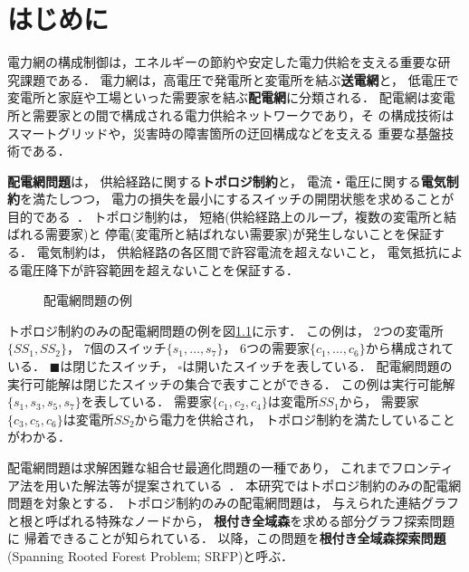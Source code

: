 \chapter{はじめに} \label{chap:intro}

電力網の構成制御は，エネルギーの節約や安定した電力供給を支える重要な研
究課題である\cite{25627,103687}．
電力網は，高電圧で発電所と変電所を結ぶ\textbf{送電網}と，
低電圧で変電所と家庭や工場といった需要家を結ぶ\textbf{配電網}に分類される．
配電網は変電所と需要家との間で構成される電力供給ネットワークであり，そ
の構成技術はスマートグリッドや，災害時の障害箇所の迂回構成などを支える
重要な基盤技術である．

\textbf{配電網問題}は，
供給経路に関する\textbf{トポロジ制約}と，
電流・電圧に関する\textbf{電気制約}を満たしつつ，
電力の損失を最小にするスイッチの開閉状態を求めることが目的である~\cite{Hayashi:dnet:model}．
トポロジ制約は，
短絡(供給経路上のループ，複数の変電所と結ばれる需要家)と
停電(変電所と結ばれない需要家)が発生しないことを保証する．
電気制約は，
供給経路の各区間で許容電流を超えないこと，
電気抵抗による電圧降下が許容範囲を超えないことを保証する．

\begin{figure}[tbp]
 \centering
 
 \caption{配電網問題の例}
 \label{fig:dnet}
\end{figure}

トポロジ制約のみの配電網問題の例を図\ref{fig:dnet}に示す．
この例は，
2つの変電所$\{SS_{1}, SS_{2}\}$，
7個のスイッチ$\{s_{1},\ldots, s_{7}\}$，
6つの需要家$\{c_{1},\ldots, c_{6}\}$から構成されている．
$\blacksquare$は閉じたスイッチ，
$\square$は開いたスイッチを表している．
配電網問題の実行可能解は閉じたスイッチの集合で表すことができる．
この例は実行可能解$\{s_{1},s_{3},s_{5},s_{7}\}$を表している．
需要家$\{c_{1},c_{2},c_{4}\}$は変電所$SS_{1}$から，
需要家$\{c_{3},c_{5},c_{6}\}$は変電所$SS_{2}$から電力を供給され，
トポロジ制約を満たしていることがわかる．

配電網問題は求解困難な組合せ最適化問題の一種であり，
これまでフロンティア法を用いた解法等が提案されている~\cite{Minato:dnet:ZDD}．
本研究ではトポロジ制約のみの配電網問題を対象とする．
トポロジ制約のみの配電網問題は，
与えられた連結グラフと根と呼ばれる特殊なノードから，
\textbf{根付き全域森}を求める部分グラフ探索問題に
帰着できることが知られている．
以降，この問題を\textbf{根付き全域森探索問題}
(Spanning Rooted Forest Problem; SRFP)と呼ぶ．

